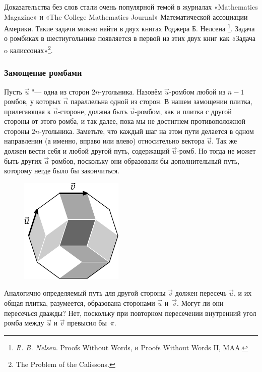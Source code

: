 \documentclass[twoside]{book}
\begin{document}
\heart

Доказательства без слов стали очень популярной темой в журналах «Mathematics Magazine» и «The College Mathematics Journal» Математической ассоциации Америки.
Такие задачи можно найти в двух книгах Роджера Б. Нелсена%
\footnote{\emph{R. B. Nelsen}. {Proofs Without Words,} и {Proofs Without Words II,} MAA.}.
Задача о ромбиках в шестиугольнике появляется в первой из этих двух книг как «Задача o калиссонах»\footnote{The Problem of the Calissons.}.

\subsubsection*{Замощение ромбами}%

Пусть $\vec u$ "--- одна из сторон $2n$-угольника.
Назовём $\vec u$-ромбом любой из $n-1$ ромбов, у которых $\vec u$ параллельна одной из сторон.
В нашем замощении плитка, прилегающая к $\vec u$-стороне, должна быть $\vec u$-ромбом, как и плитка с другой стороны от этого ромба, и так далее, пока мы не достигнем противоположной стороны $2n$-угольника.
Заметьте, что каждый шаг на этом пути делается в одном направлении (а именно, вправо или влево) относительно вектора $\vec u$. 
Так же должен вести себя и любой другой путь, содержащий $\vec u$-ромб.
Но тогда не может быть других $\vec u$-ромбов, поскольку они образовали бы дополнительный путь, которому негде было бы закончиться.

\begin{figure}[!ht]
\centering
\includegraphics{mp/wink-14} 
\end{figure}

Аналогично определяемый путь для другой стороны $\vec v$ должен пересечь $\vec u$, и их общая плитка, разумеется, образована сторонами $\vec u$ и~$\vec v$.
Могут ли они пересечься дважды?
Нет, поскольку при повторном пересечении внутренний угол ромба между $\vec u$ и $\vec v$ превысил бы~$\pi$. \heart
\end{document}
